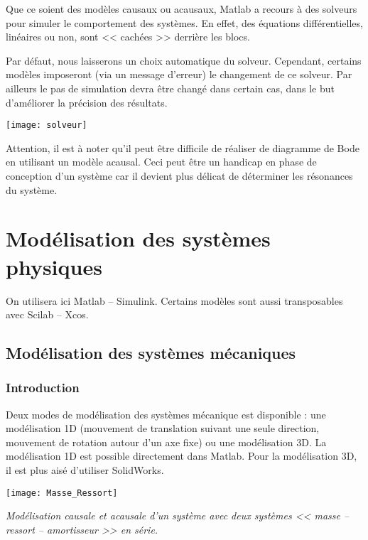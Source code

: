 \noindent
\begin{minipage}[c]{.6\linewidth}
Que ce soient des modèles causaux ou acausaux, Matlab a recours à des solveurs pour simuler le comportement des systèmes. En effet, des équations différentielles, linéaires ou non, sont << cachées >> derrière les blocs.  

Par défaut, nous laisserons un choix automatique du solveur. Cependant, certains modèles imposeront (via un message d'erreur) le changement de ce solveur. Par ailleurs le pas de simulation devra être changé dans certain cas, dans le but d'améliorer la précision des résultats.
\end{minipage} \hfill
\begin{minipage}[c]{.35\linewidth}
\begin{center}
\texttt{[image: solveur]}
\end{center}
\end{minipage}

\begin{warn}
Attention, il est à noter qu'il peut être difficile de réaliser de diagramme de Bode en utilisant un modèle acausal. Ceci peut être un handicap en phase de conception d'un système car il devient plus délicat de déterminer les résonances du système.
\end{warn}
\section{Modélisation des systèmes physiques}
On utilisera ici Matlab -- Simulink. Certains modèles sont aussi transposables avec Scilab -- Xcos. 

\subsection{Modélisation des systèmes mécaniques}
\subsubsection{Introduction}
Deux modes de modélisation des systèmes mécanique est disponible : une modélisation 1D (mouvement de translation suivant une seule direction, mouvement de rotation autour d'un axe fixe) ou une modélisation 3D. 
La modélisation 1D est possible directement dans Matlab. Pour la modélisation 3D, il est plus aisé d'utiliser SolidWorks. 

\begin{center}
\texttt{[image: Masse\_Ressort]}

\textit{Modélisation causale et acausale d'un système avec deux systèmes << masse -- ressort -- amortisseur >> en série.}
\end{center}

